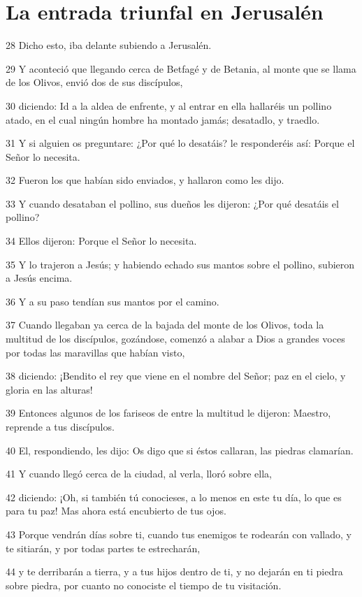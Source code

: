 \section*{La entrada triunfal en Jerusalén}

\par 28 Dicho esto, iba delante subiendo a Jerusalén.
\par 29 Y aconteció que llegando cerca de Betfagé y de Betania, al monte que se llama de los Olivos, envió dos de sus discípulos,
\par 30 diciendo: Id a la aldea de enfrente, y al entrar en ella hallaréis un pollino atado, en el cual ningún hombre ha montado jamás; desatadlo, y traedlo.
\par 31 Y si alguien os preguntare: ¿Por qué lo desatáis? le responderéis así: Porque el Señor lo necesita.
\par 32 Fueron los que habían sido enviados, y hallaron como les dijo.
\par 33 Y cuando desataban el pollino, sus dueños les dijeron: ¿Por qué desatáis el pollino?
\par 34 Ellos dijeron: Porque el Señor lo necesita.
\par 35 Y lo trajeron a Jesús; y habiendo echado sus mantos sobre el pollino, subieron a Jesús encima.
\par 36 Y a su paso tendían sus mantos por el camino.
\par 37 Cuando llegaban ya cerca de la bajada del monte de los Olivos, toda la multitud de los discípulos, gozándose, comenzó a alabar a Dios a grandes voces por todas las maravillas que habían visto,
\par 38 diciendo: ¡Bendito el rey que viene en el nombre del Señor; paz en el cielo, y gloria en las alturas!
\par 39 Entonces algunos de los fariseos de entre la multitud le dijeron: Maestro, reprende a tus discípulos.
\par 40 El, respondiendo, les dijo: Os digo que si éstos callaran, las piedras clamarían.
\par 41 Y cuando llegó cerca de la ciudad, al verla, lloró sobre ella,
\par 42 diciendo: ¡Oh, si también tú conocieses, a lo menos en este tu día, lo que es para tu paz! Mas ahora está encubierto de tus ojos.
\par 43 Porque vendrán días sobre ti, cuando tus enemigos te rodearán con vallado, y te sitiarán, y por todas partes te estrecharán,
\par 44 y te derribarán a tierra, y a tus hijos dentro de ti, y no dejarán en ti piedra sobre piedra, por cuanto no conociste el tiempo de tu visitación.

